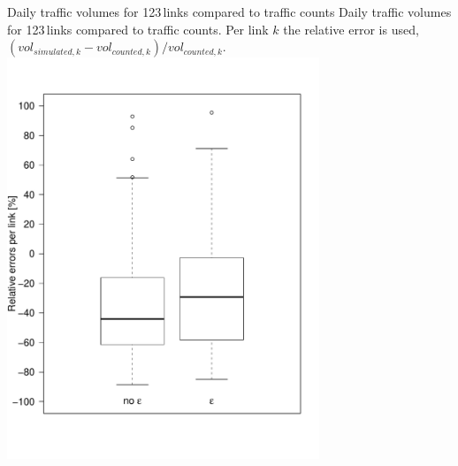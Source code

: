 \createfigure%
{Daily traffic volumes for 123\,links compared to traffic counts}%
{Daily traffic volumes for 123\,links compared to traffic counts. Per link $k$ the relative error is used, \ie $(vol_{simulated,k}-vol_{counted,k}) / vol_{counted,k}$.}%
{\label{fig:countsLEGO}}%
{\includegraphics[width=0.7\textwidth, angle=0]{extending/figures/dc/zhCounts.pdf}}%
{}

%


